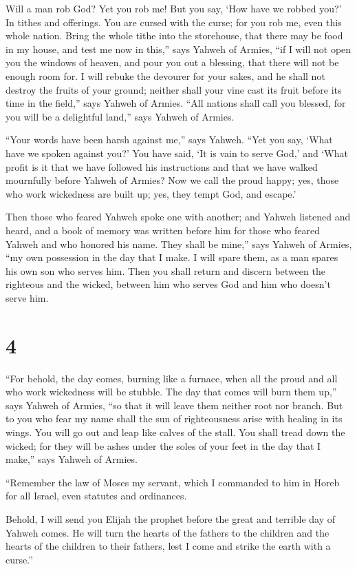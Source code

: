  Will a man rob God? Yet you rob me! But you say, `How
have we robbed you?' In tithes and offerings.  You are
cursed with the curse; for you rob me, even this whole nation.
 Bring the whole tithe into the storehouse, that there
may be food in my house, and test me now in this,'' says Yahweh of
Armies, ``if I will not open you the windows of heaven, and pour you out
a blessing, that there will not be enough room for.  I
will rebuke the devourer for your sakes, and he shall not destroy the
fruits of your ground; neither shall your vine cast its fruit before its
time in the field,'' says Yahweh of Armies.  ``All
nations shall call you blessed, for you will be a delightful land,''
says Yahweh of Armies.

 ``Your words have been harsh against me,'' says Yahweh.
``Yet you say, `What have we spoken against you?'  You
have said, `It is vain to serve God,' and `What profit is it that we
have followed his instructions and that we have walked mournfully before
Yahweh of Armies?  Now we call the proud happy; yes,
those who work wickedness are built up; yes, they tempt God, and
escape.'

 Then those who feared Yahweh spoke one with another; and
Yahweh listened and heard, and a book of memory was written before him
for those who feared Yahweh and who honored his name. 
They shall be mine,'' says Yahweh of Armies, ``my own possession in the
day that I make. I will spare them, as a man spares his own son who
serves him.  Then you shall return and discern between
the righteous and the wicked, between him who serves God and him who
doesn't serve him.

\hypertarget{section-3}{%
\section{4}\label{section-3}}

 ``For behold, the day comes, burning like a furnace, when
all the proud and all who work wickedness will be stubble. The day that
comes will burn them up,'' says Yahweh of Armies, ``so that it will
leave them neither root nor branch.  But to you who fear
my name shall the sun of righteousness arise with healing in its wings.
You will go out and leap like calves of the stall.  You
shall tread down the wicked; for they will be ashes under the soles of
your feet in the day that I make,'' says Yahweh of Armies.

 ``Remember the law of Moses my servant, which I commanded
to him in Horeb for all Israel, even statutes and ordinances.

 Behold, I will send you Elijah the prophet before the
great and terrible day of Yahweh comes.  He will turn the
hearts of the fathers to the children and the hearts of the children to
their fathers, lest I come and strike the earth with a curse.''
